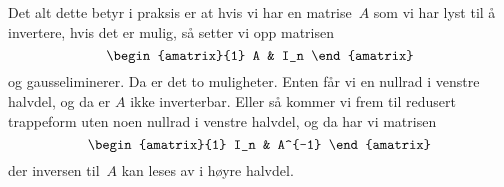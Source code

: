 Det alt dette betyr i praksis er at hvis vi har en matrise~$A$ som vi
har lyst til å invertere, hvis det er mulig, så setter vi opp matrisen
\[
\begin{amatrix}{1} A & I_n \end{amatrix}
\]
og gausseliminerer.  Da er det to muligheter.  Enten får vi en nullrad
i venstre halvdel, og da er $A$ ikke inverterbar.  Eller så kommer vi
frem til redusert trappeform uten noen nullrad i venstre halvdel, og
da har vi matrisen
\[
\begin{amatrix}{1} I_n & A^{-1} \end{amatrix}
\]
der inversen til~$A$ kan leses av i høyre halvdel.



\kapittelslutt
